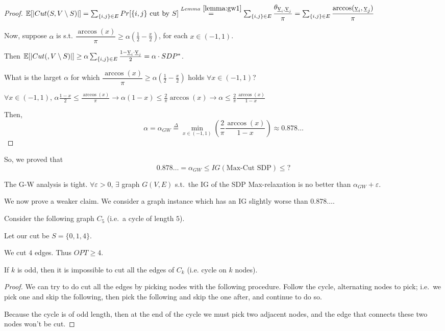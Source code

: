     \begin{proof}
        $\mathbb{E}[\vert Cut(S,V \setminus S) \vert] =
        \sum_{\{i,j\} \in E} Pr[\{i,j\} \text{ cut by } S] \overset{Lemma~\ref{lemma:gw1}}{=}
        \sum_{\{i,j\} \in E} \dfrac{\theta_{\underbar{v}_i,\underbar{v}_j}}{\pi} = 
        \sum_{\{i,j\} \in E} \dfrac{\arccos(\underbar{v}_i, \underbar{v}_j)}{\pi}$

        Now, suppose $\alpha$ is s.t.  $\dfrac{\arccos(x)}{\pi} \geq \alpha (\frac{1}{2} - \frac{x}{2})$, for each $x \in (-1,1)$.

        Then $\mathbb{E}[\vert Cut(, V \setminus S) \vert] \geq \alpha \sum_{\{i,j\} \in E} \frac{1 - \underbar{v}_i \cdot \underbar{v}_j}{2} = \alpha \cdot SDP^*$.

        What is the larget $\alpha$ for which $\dfrac{\arccos(x)}{\pi} \geq \alpha (\frac{1}{2} - \frac{x}{2})$ holds $\forall x \in (-1,1)$?

        $\forall x \in (-1,1)$,
        $\alpha  \frac{1-x}{2} \leq \frac{\arccos(x)}{\pi} \rightarrow
        \alpha (1-x) \leq \frac{2}{\pi} \arccos(x) \rightarrow
        \alpha \leq \frac{2}{\pi} \frac{\arccos(x)}{1-x}$

        Then,
        \[ \alpha = \alpha_{GW} \overset{\Delta}{=} \min_{x \in (-1,1)} (\frac{2}{\pi} \frac{\arccos(x)}{1-x}) \approx 0.878\dots \]
    \end{proof}

    So, we proved that
    \[ 0.878\dots = \alpha_{GW} \leq IG (\text{Max-Cut SDP}) \leq ? \]

    The G-W analysis is tight.
    $\forall \varepsilon > 0$, $\exists$ graph $G(V,E)$ s.t.~the IG of the SDP Max-relaxation is no better than $\alpha_{GW} + \varepsilon$.

    We now prove a weaker claim.
    We consider a graph instance which has an IG slightly worse than $0.878\dots$.

    Consider the following graph $C_5$ (i.e.~a cycle of length $5$).


    Let our cut be $S = \{ 0,1,4 \}$.

    We cut $4$ edges. Thus $OPT \geq 4$.

    \begin{lemma}
        If $k$ is odd, then it is impossible to cut all the edges of $C_k$ (i.e. cycle on $k$ nodes).
    \end{lemma}

    \begin{proof}
        We can try to do cut all the edges by picking nodes with the following procedure.
        Follow the cycle, alternating nodes to pick; i.e.~we pick one and skip the following, then pick the following and skip the one after, and continue to do so.

        Because the cycle is of odd length, then at the end of the cycle we must pick two adjacent nodes, and the edge that connects these two nodes won't be cut.
    \end{proof}


